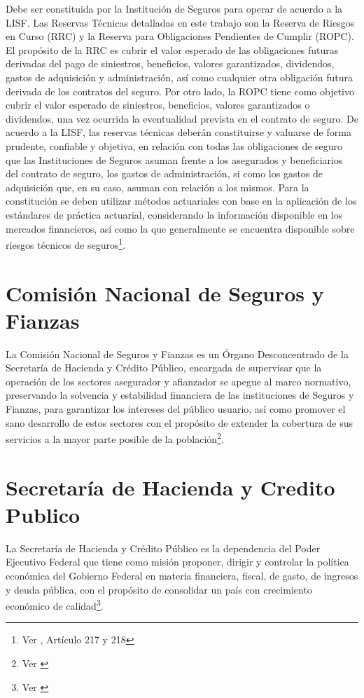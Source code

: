\documentclass[11pt,twoside,openright,spanish]{report}
\numberwithin{equation}{chapter}
\numberwithin{figure}{chapter}
\numberwithin{table}{chapter}
\begin{document}
	Debe ser constituida por la Institución de Seguros para operar de acuerdo a la LISF. Las Reservas Técnicas detalladas en este trabajo son la Reserva de Riesgos en Curso (RRC) y la Reserva para Obligaciones Pendientes de Cumplir (ROPC). El propósito de la RRC es cubrir el valor esperado de las obligaciones futuras derivadas del pago de siniestros, beneficios, valores garantizados, dividendos, gastos de adquisición y administración, así como cualquier otra obligación futura derivada de los contratos del seguro. Por otro lado, la ROPC tiene como objetivo cubrir el valor esperado de siniestros, beneficios, valores garantizados o dividendos, una vez ocurrida la eventualidad prevista en el contrato de seguro. De acuerdo a la LISF, las reservas técnicas deberán constituirse y valuarse de forma prudente, confiable y objetiva, en relación con todas las obligaciones de seguro que las Instituciones de Seguros asuman frente a los asegurados y beneficiarios del contrato de seguro, los gastos de administración, si como los gastos de adquisición que, en su caso, asuman con relación a los mismos. Para la constitución se deben utilizar métodos actuariales con base en la aplicación de los estándares de práctica actuarial, considerando la información disponible en los mercados financieros, así como la que generalmente se encuentra disponible sobre riesgos técnicos de seguros\footnote{Ver \citet{DReservasTec}, Artículo 217 y 218}. 
	
	\section{Comisión Nacional de Seguros y Fianzas}

	La Comisión Nacional de Seguros y Fianzas es un Órgano Desconcentrado de la Secretaría de Hacienda y Crédito Público, encargada de supervisar que la operación de los sectores asegurador y afianzador se apegue al marco normativo, preservando la solvencia y estabilidad financiera de las instituciones de Seguros y Fianzas, para garantizar los intereses del público usuario, así como promover el sano desarrollo de estos sectores con el propósito de extender la cobertura de sus servicios a la mayor parte posible de la población\footnote{Ver \citet{EComision}}. 
	
	\section{Secretaría de Hacienda y Credito Publico}
	
	La Secretaría de Hacienda y Crédito Público es la dependencia del Poder Ejecutivo Federal que tiene como misión proponer, dirigir y controlar la política económica del Gobierno Federal en materia financiera, fiscal, de gasto, de ingresos y deuda pública, con el propósito de consolidar un país con crecimiento económico de calidad\footnote{Ver \citet{NSHCP}}.
	
\end{document}

